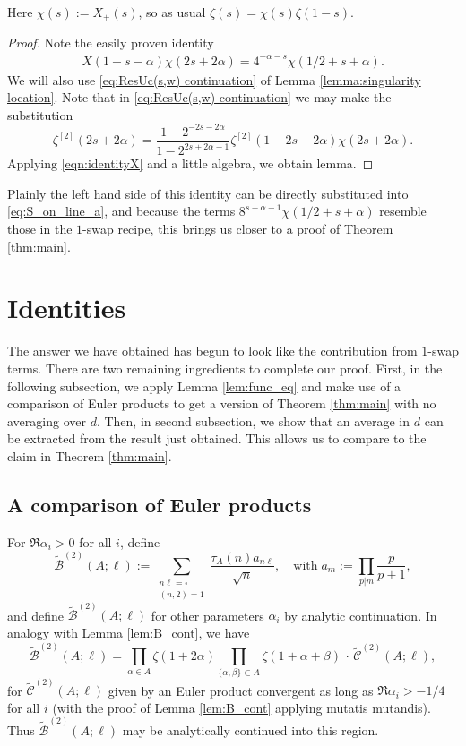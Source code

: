 \documentclass[12pt]{amsart}
\begin{document}
	Here $\chi(s) := X_+(s)$, so as usual $\zeta(s) = \chi(s)\zeta(1-s).$
	
	\begin{proof}
		Note the easily proven identity 
		\begin{eqnarray} \label{eqn:identityX} X(1-s-\alpha) \chi(2s+2\alpha)=4^{-\alpha-s }\chi(1/2+s+ \alpha).\end{eqnarray}
		We will also use \eqref{eq:ResUc(s,w) continuation} of Lemma \ref{lemma:singularity location}. Note that in \eqref{eq:ResUc(s,w) continuation} we may make the substitution
		$$
		\zeta^{[2]}(2s+2\alpha) = \frac{1-2^{-2s-2\alpha}}{1-2^{2s+2\alpha-1}} \zeta^{[2]}(1-2s-2\alpha) \chi(2s+2\alpha).
		$$
		Applying \eqref{eqn:identityX} and a little algebra, we obtain lemma.
	\end{proof}
	
	Plainly the left hand side of this identity can be directly substituted into \eqref{eq:S_on_line_a}, and because the terms $8^{s+\alpha-1} \chi(1/2+s+\alpha)$ resemble those in the $1$-swap recipe, this brings us closer to a proof of Theorem \ref{thm:main}.
	
	\section{Identities}
	\label{sec:identities}
	
	The answer we have obtained has begun to look like the contribution from $1$-swap terms. There are two remaining ingredients to complete our proof. First, in the following subsection, we apply Lemma \ref{lem:func_eq} and make use of a comparison of Euler products to get a version of Theorem \ref{thm:main} with no averaging over $d$. Then, in second subsection, we show that an average in $d$ can be extracted from the result just obtained. This allows us to compare to the claim in Theorem \ref{thm:main}.
	
	\subsection{A comparison of Euler products}
	\label{sec:euler_compare}
	
	For $\Re \alpha_i > 0$ for all $i$, define
	$$
	\tilde{\mathcal{B}}^{(2)}(A;\ell):= \sum_{\substack{n\ell = \square \\ (n,2)=1}} \frac{\tau_A(n) a_{n\ell}}{\sqrt{n}}, \quad \textrm{with}\; a_m:= \prod_{p|m} \frac{p}{p+1},
	$$
	and define $\tilde{\mathcal{B}}^{(2)}(A;\ell)$ for other parameters $\alpha_i$ by analytic continuation. In analogy with Lemma \ref{lem:B_cont}, we have
	$$
	\tilde{\mathcal{B}}^{(2)}(A;\ell) = \prod_{\alpha \in A} \zeta(1+2\alpha) \prod_{\{\alpha,\beta\} \subset A} \zeta(1+\alpha+\beta)\, \cdot \, \tilde{\mathcal{C}}^{(2)}(A;\ell),
	$$
	for $\tilde{\mathcal{C}}^{(2)}(A;\ell)$ given by an Euler product convergent as long as $\Re \alpha_i > -1/4$ for all $i$ (with the proof of Lemma \ref{lem:B_cont} applying mutatis mutandis). Thus $\tilde{\mathcal{B}}^{(2)}(A;\ell)$ may be analytically continued into this region.
	
\end{document}
